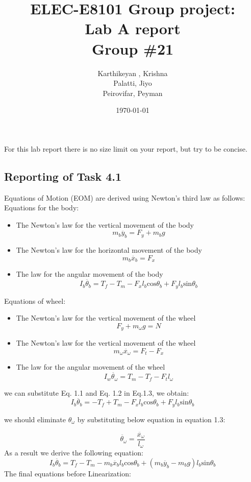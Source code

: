 \documentclass[11pt]{article}
\title{\Huge ELEC-E8101 Group project: \\ Lab A report \\ Group \#21}
\date{\today}
\author{
Karthikeyan , Krishna\\
\newline
Palatti, Jiyo\\
\newline
Peirovifar, Peyman\\
\newline
}
\begin{document}
\maketitle

\begin{instructions}
For this lab report there is no size limit on your report, but try to be concise.	
\end{instructions}



\subsection*{Reporting of Task 4.1}
Equations of Motion (EOM) are derived using Newton's third law as follows:
\newline
Equations for the body:
\begin{itemize}
    \item The Newton’s law for the vertical movement of the body
    $$m_b \ddot{y_b } = F_y + m_bg$$
    \item The Newton’s law for the horizontal movement of the body
    $$m_b\ddot{x_b} = F_x $$
    \item The law for the angular movement of the body
    $$I_b \ddot{\theta_b} =  T_f - T_m - F_x l_b \mathrm{cos}\theta_b +F_y l_b \mathrm{sin}\theta_b$$
\end{itemize}
\newline
Equations of wheel:
\begin{itemize}
    \item The Newton’s law for the vertical movement of the wheel
    $$F_y + m_\omega g = N$$
    \item The Newton’s law for the vertical movement of the wheel
    $$m_\omega \ddot{x_\omega} = F_t - F_x$$
    \item The law for the angular movement of the wheel
    $$I_w \ddot{\theta_\omega} = T_m - T_f - F_t l _\omega$$
\end{itemize}
\newpage
we can substitute Eq. 1.1 and Eq. 1.2 in Eq.1.3, we obtain:
$$I_b \ddot{\theta_b} = - T_f + T_m - F_x l_b \mathrm{cos}\theta_b +F_y l_b \mathrm{sin}\theta_b$$


we should eliminate $\theta_\omega$ by substituting below equation in equation 1.3:

\[\ddot{\theta_\omega}=\frac{\ddot{x_\omega}}{l_\omega}\]
As a result we derive the following equation:
$$I_b \ddot{\theta_b} =  T_f - T_m - m_b \ddot{x_b} l_b \mathrm{cos}\theta_b + (m_b \ddot{y_b} - m_b g) l_b \mathrm{sin}\theta_b$$
The final equations before Linearization:
\end{document}
